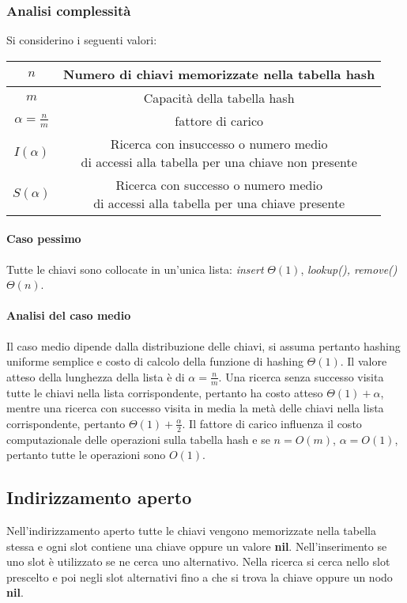 \subsubsection{Analisi complessit\`a}
Si considerino i seguenti valori:
\begin{center}
    \begin{tabular}{|c|c|}
        \hline
        $n$                  & Numero di chiavi memorizzate nella tabella hash \\
        \hline
        $m$                  & Capacit\`a della tabella hash                   \\
        \hline
        $\alpha=\frac{n}{m}$ & fattore di carico                               \\
        \hline
        $I(\alpha)$          & \makecell{Ricerca con insuccesso o numero medio \\di accessi alla tabella per una chiave non presente}\\
        \hline
        $S(\alpha)$          & \makecell{Ricerca con successo o numero medio   \\di accessi alla tabella per una chiave presente}\\
        \hline
    \end{tabular}
\end{center}
\paragraph{Caso pessimo}
Tutte le chiavi sono collocate in un'unica lista: \emph{insert{}} $\Theta(1)$, \emph{lookup(), remove()} $\Theta(n)$.
\paragraph{Analisi del caso medio}
Il caso medio dipende dalla distribuzione delle chiavi, si assuma pertanto hashing uniforme semplice e costo di calcolo della funzione di hashing $\Theta(1)
$. Il valore atteso della lunghezza della lista \`e di $\alpha=\frac{n}{m}$. Una ricerca senza successo visita tutte le chiavi nella lista corrispondente,
pertanto ha costo atteso $\Theta(1)+\alpha$, mentre una ricerca con successo visita in media la met\`a delle chiavi nella lista corrispondente, pertanto
$\Theta(1)+\frac{\alpha}{2}$. Il fattore di carico influenza il costo computazionale delle operazioni sulla tabella hash e se $n=O(m)$, $\alpha=O(1)$,
pertanto tutte le operazioni sono $O(1)$.
\subsection{Indirizzamento aperto}
Nell'indirizzamento aperto tutte le chiavi vengono memorizzate nella tabella stessa e ogni slot contiene una chiave oppure un valore \textbf{nil}.
Nell'inserimento se uno slot \`e utilizzato se ne cerca uno alternativo. Nella ricerca si cerca nello slot prescelto e poi negli slot alternativi fino a
che si trova la chiave oppure un nodo \textbf{nil}.
